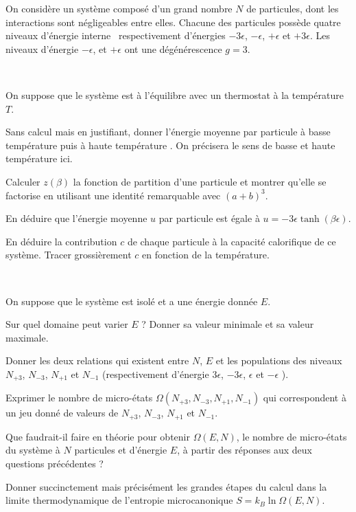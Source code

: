 On considère un système composé d'un grand nombre $N$ de particules, dont les interactions sont négligeables entre elles. Chacune des particules possède quatre niveaux d'énergie \og interne \fg \, respectivement d'énergies $-3\epsilon$, $-\epsilon$,  $+ \epsilon$ et  $+3 \epsilon$.  Les niveaux d'énergie $-\epsilon$,  et $+\epsilon$ ont une dégénérescence $g=3$.

\


 On suppose que le système est à l'équilibre avec un thermostat à la température $T$.

 \question Sans calcul mais en justifiant, donner l'énergie moyenne par particule à \og basse température \fg puis à \og haute température \fg. On précisera le sens de basse et haute température ici.
 
\question Calculer $z(\beta)$ la fonction de partition d'une particule et montrer qu'elle se factorise en utilisant une identité remarquable avec $(a+b)^3$.

\question
En déduire que l'énergie  moyenne $u$ par particule est égale à $u=- 3\epsilon \tanh (\beta \epsilon)$.

\question
En déduire la contribution $c$ de chaque particule à la capacité calorifique de ce système. Tracer grossièrement $c$ en fonction de la température.

\



On suppose que le système est isolé et a une énergie donnée $E$.

\question Sur quel domaine peut varier $E$ ? Donner sa valeur minimale et sa valeur maximale.

\question Donner les deux relations qui existent entre $N$, $E$ et les populations des niveaux $N_{+3}$, $N_{-3}$, $N_{+1}$ et $N_{-1}$ (respectivement d'énergie $3 \epsilon$, $-3 \epsilon$, $\epsilon$ et $-\epsilon$ ).

\question Exprimer le nombre de micro-états $\Omega(N_{+3},N_{-3},N_{+1},N_{-1})$ qui correspondent à un jeu donné de valeurs de $N_{+3}$, $N_{-3}$, $N_{+1}$ et $N_{-1}$.

\question Que faudrait-il faire \og en théorie \fg pour obtenir $\Omega(E,N)$, le nombre de micro-états du système à $N$ particules et d'énergie $E$, à partir des réponses aux deux questions précédentes ?

\question Donner succinctement mais précisément les grandes étapes du calcul dans la limite thermodynamique de l'entropie microcanonique $S=k_B \ln \Omega(E,N)$. 